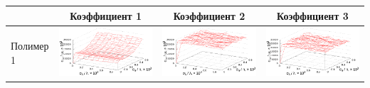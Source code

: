 \documentclass[12pt,a4paper]{article}
\begin{document}
\begin{table}[h]
  \centering
  \footnotesize
  \begin{tabular}{l | c c c}
	  & Коэффициент 1 & Коэффициент 2 & Коэффициент 3 \\ \hline
	\begin{rotate}{90}Полимер 1\end{rotate} &	\includegraphics[scale=0.4]{figs/resonance/p1.txt_coeff0.dat.eps} & \includegraphics[scale=0.4]{figs/resonance/p1.txt_coeff1.dat.eps} & \includegraphics[scale=0.4]{figs/resonance/p1.txt_coeff2.dat.eps} \\

\end{tabular}
\end{table}
\end{document}
